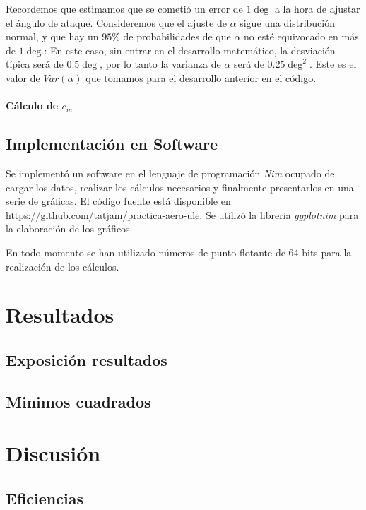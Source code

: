 \documentclass{article}
\begin{document}
Recordemos que estimamos que se cometió un error  de $1\deg$ a la hora de ajustar el ángulo de ataque. Consideremos 
que el ajuste de $\alpha$ sigue una distribución normal, y que hay un $95\%$ de probabilidades de que $\alpha$ no esté equivocado
en más de $1\deg$: En este caso, sin entrar en el desarrollo matemático, 
la desviación típica será de $0.5\deg$, por lo tanto la varianza de $\alpha$ será de $0.25\deg^2$. Este es el valor de 
$Var(\alpha)$ que tomamos para el desarrollo anterior en el código.

\paragraph{Cálculo de $c_m$}


\subsection{Implementación en Software}

Se implementó un software en el lenguaje de programación \textit{Nim} ocupado de cargar los datos, realizar los cálculos
necesarios y finalmente presentarlos en una serie de gráficas. El código fuente está disponible en 
\url{https://github.com/tatjam/practica-aero-ule}. Se utilizó la libreria \textit{ggplotnim} para la elaboración
de los gráficos.

En todo momento se han utilizado números de punto flotante de 64 bits para la realización de los cálculos.

\section{Resultados}

\subsection{Exposición resultados}

\subsection{Minimos cuadrados}

\section{Discusión}

\subsection{Eficiencias}
\end{document}
